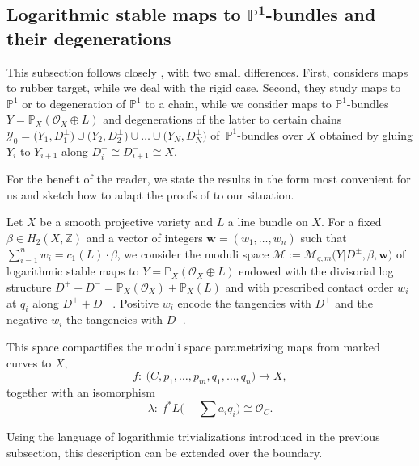 \documentclass[pdftex]{sigma}
\newcommand{\bfw}{ {\boldsymbol w} }
\newcommand{\M}{\mathcal{M}}
\newcommand{\Y}{\mathcal{Y}}
\numberwithin{equation}{section}
\theoremstyle{definition}
\begin{document}
\subsection[Logarithmic stable maps to P\^{}1-bundles and their degenerations]{Logarithmic stable maps to $\boldsymbol{\mathbb P^1}$-bundles and their degenerations}

This subsection follows closely \cite[Section~5]{marcuswiselog}, with two small differences. First, \cite{marcuswiselog} considers maps to rubber target, while we deal with the rigid case. Second, they study maps to $\mathbb{P}^1$ or to degeneration of $\mathbb P^1$ to a chain, while we consider maps to $\mathbb{P}^1$-bundles $Y=\mathbb P_X(\mathcal O_X\oplus L)$ and degenerations of the latter to certain chains $\Y_0=\bigl(Y_1,D_1^\pm\bigr)\cup \bigl(Y_2,D_2^\pm\bigr)\cup\dots\cup\bigl(Y_N,D_N^\pm\bigr)$ of~$\mathbb{P}^1$-bundles over $X$ obtained by gluing $Y_i$ to $Y_{i+1}$ along $D_i^+\cong D_{i+1}^-\cong X$.

For the benefit of the reader, we state the results in the form most convenient for us and sketch how to adapt the proofs of \cite[Section~5]{marcuswiselog} to our situation.

Let $X$ be a smooth projective variety and $L$ a line bundle on $X$.
For a fixed $\beta\in H_2(X,\mathbb Z)$ and a vector of integers $\bfw=(w_1,\dots,w_n)$ such that $\sum_{i=1}^n w_i=c_1(L)\cdot\beta$, we consider the moduli space
$\M := \M_{g,m}\bigl(Y|D^{\pm},\beta,\bfw\bigr)$
of logarithmic stable maps to $Y=\mathbb P_X(\mathcal O_X\oplus L)$ endowed with the divisorial log structure $D^++D^-=\mathbb P_X(\mathcal O_X) +\mathbb P_X(L)$ and with prescribed contact order $w_i$ at $q_i$ along $D^++D^-$ \cite{abramovich2014stable,gross2013logarithmic}.
Positive $w_i$ encode the tangencies with $D^+$ and the negative $w_i$ the tangencies with $D^-$.

This space compactifies the moduli space parametrizing maps from marked curves to $X$,
\[f\colon\ \bigl(C,p_1,\dots, p_m,q_1,\dots,q_n\bigr)\to X,\]
together with an isomorphism
\[\lambda\colon\ f^* L\biggl(-\sum a_i q_i\biggr)\cong\mathcal O_C.\]

Using the language of logarithmic trivializations introduced in the previous subsection, this description can be extended over the boundary.
\end{document}

